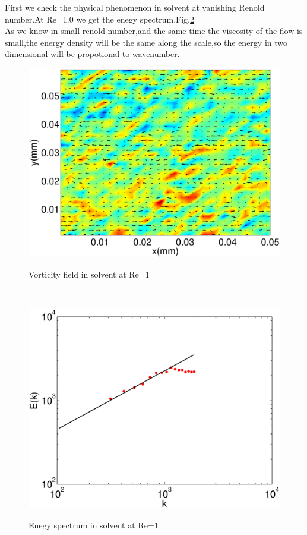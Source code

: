 \documentclass[aps,prl,twocolumn,showpacs,superscriptaddress,groupedaddress]{revtex4}  %
\begin{document}
First we check the physical phenomenon in solvent at vanishing Renold number.At Re=1.0
we get the enegy spectrum,Fig.\ref{fig:spesols}\\As we know in small renold number,and the same time the viscosity of the flow is small,the energy density will be the same 
along the scale,so the energy in two dimensional will be propotional to wavenumber.
\begin{figure}
 \includegraphics[scale=0.35]{vorsols}
\label{fig:spesols}
\caption{Vorticity field in solvent at Re=1}
\end{figure} \\
\begin{figure}
 \includegraphics[scale=0.35]{spesols}
\label{fig:spesols}
\caption{Enegy spectrum in solvent at Re=1}
\end{figure} \\
\end{document}
